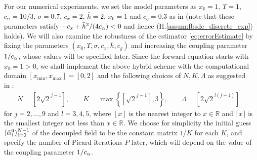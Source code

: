 \documentclass[11pt]{article}
\numberwithin{equation}{section}
\theoremstyle{definition}
\theoremstyle{remark}
\def\l{\label}  \def\f{\frac}  \def\fa{\forall}
\def\sR{{\mathbb R}}
\begin{document}
For our numerical experiments,
we set 
the model parameters as 
$x_0=1$, $T=1$,
$c_{\alpha} = 10/3$, $\sigma = 0.7$, $c_x = 2$, $\bar{h}=2$, $x_0=1$
and $c_g=0.3$ as in \cite{carmona2018a}
(note that  these parameters satisfy 
$-c_x+\bar{h}^2/(4c_\alpha)<0$
and hence 
 (H.\ref{assum:fbsde_discrete_exp}) holds).
We will also
examine the robustness of the estimator  \eqref{eq:errorEstimate} 
by 
fixing the   parameters 
$(x_0, T, \sigma,c_x, \bar{h},c_g)$
and
 increasing the coupling parameter $1/c_\alpha$,
 whose values will be specified later.
Since the forward equation starts with $x_0=1>0$, we shall implement the above hybrid  scheme
with
the computational domain 
$[x_{\min}, x_{\max}]=[0,2]$
and
 the following choices of  
$N,K,\Lambda$
 as suggested in
\cite{bender2013}:
\begin{align}\l{eq:NKLambda}
N = \left[2 \sqrt{2}^{j-1} \right], \qquad K = \max \left \lbrace \left \lceil \sqrt{2}^{j-1} \right  \rceil, 3 \right \rbrace, \qquad \Lambda = \left[2 \sqrt{2}^{l(j-1)} \right]
\end{align} 
for $j=2, \ldots, 9$ and $l=3,4,5$,
where $[x]$ is the nearest integer to $x\in \sR$ and $\lceil x \rceil$ is the  smallest integer not less than $x\in \sR$.
We choose for simplicity
the initial guess 
 $(\hat{\alpha}^{0}_i)_{i=0}^{N-1}$
 of the decoupled field
 to be the constant matrix $1/K$ for each $K$,
 and specify the number of Picard iterations  $P$ later,
 which will
  depend on the value of the coupling parameter $1/c_\alpha$.
\end{document}
